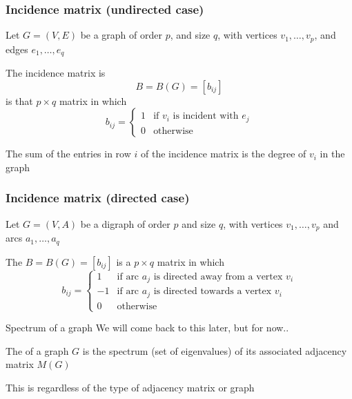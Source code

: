 \documentclass[aspectratio=43]{beamer}
\begin{document}
\begin{frame}\frametitle{Incidence matrix (undirected case)}
	Let $G=(V,E)$ be a graph of order $p$, and size $q$, with vertices $v_1, \ldots , v_p$, and edges $e_1, \ldots , e_q$
	\begin{definition}
		The incidence matrix is $$B=B(G)=[b_{ij}]$$ is that $p\times q$ matrix in which
		$$b_{ij}=\left \{ 
		\begin{array}{cc}
			1 & \textrm{if } v_i \textrm{ is incident with } e_j\\
			0 & \textrm{otherwise}
		\end{array}
		\right .
		$$
	\end{definition}
	\begin{theorem}
		The sum of the entries in row $i$ of the incidence matrix is the degree of $v_i$ in the graph
	\end{theorem}
\end{frame}


\begin{frame}\frametitle{Incidence matrix (directed case)}
	Let $G=(V,A)$ be a digraph of order $p$ and size $q$, with vertices $v_1, \ldots , v_p$ and arcs $a_1, \ldots , a_q$
	\begin{definition}
	The  $B=B(G)=[b_{ij}]$ is a $p\times q$ matrix in which
	$$b_{ij}=\left \{ 
	\begin{array}{cl}
	1 & \textrm{if arc } a_j  \textrm{ is directed away from a vertex } v_i\\
	-1 & \textrm{if arc } a_j  \textrm{ is directed towards a vertex } v_i\\
	0 & \textrm{otherwise}
	\end{array}
	\right .
	$$
	\end{definition}
\end{frame}
	



\begin{frame}{Spectrum of a graph}
	We will come back to this later, but for now..
	\vfill
	\begin{definition}
		The  of a graph $G$ is the spectrum (set of eigenvalues) of its associated adjacency matrix $M(G)$
	\end{definition}
	\vfill
	This is regardless of the type of adjacency matrix or graph
\end{frame}
\end{document}
